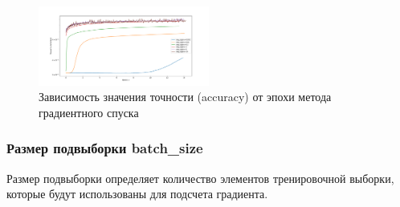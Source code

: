 \documentclass[a4paper, 11pt]{article}
\begin{document}
\begin{figure}[H]
\begin{multicols}{2}
\begin{center}
                        \caption{Зависимость значения точности (accuracy) от эпохи метода градиентного спуска} \label{exp2:sgd_acc_iter}
                        \includegraphics[width=0.5\textwidth, height=0.25\textheight]{../graphs/exp1_accuracy_GD_alpha_time_beta=0,001.pdf}
                    \end{center}
                \end{multicols}
            \end{figure}
            
            \subsubsection{Размер подвыборки batch\_size}
                Размер подвыборки определяет количество элементов тренировочной выборки, которые будут использованы для подсчета градиента.
            
\end{document}
